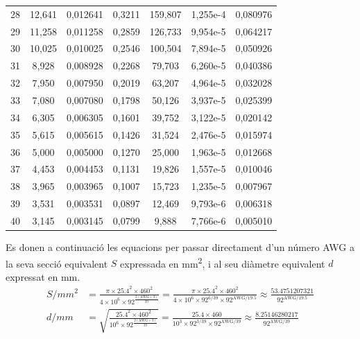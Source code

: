 \begin{longtable}{S[table-format=4.0]S[table-format=3.3]
                  S[table-format=2.6]S[table-format=2.4]
                  S[table-format=6.3]S[table-format=1.3e1]
                  S[table-format=3.6]}
28 &     12,641 &   0,012641 &     0,3211 &    159,807 &  1,255e-4 &   0,080976 \\
29 &     11,258 &   0,011258 &     0,2859 &    126,733 &  9,954e-5 &   0,064217 \\
30 &     10,025 &   0,010025 &     0,2546 &    100,504 &  7,894e-5 &   0,050926 \\
31 &      8,928 &   0,008928 &     0,2268 &     79,703 &  6,260e-5 &   0,040386 \\
32 &      7,950 &   0,007950 &     0,2019 &     63,207 &  4,964e-5 &   0,032028 \\
33 &      7,080 &   0,007080 &     0,1798 &     50,126 &  3,937e-5 &   0,025399 \\
34 &      6,305 &   0,006305 &     0,1601 &     39,752 &  3,122e-5 &   0,020142 \\
35 &      5,615 &   0,005615 &     0,1426 &     31,524 &  2,476e-5 &   0,015974 \\
36 &      5,000 &   0,005000 &     0,1270 &     25,000 &  1,963e-5 &   0,012668 \\
37 &      4,453 &   0,004453 &     0,1131 &     19,826 &  1,557e-5 &   0,010046 \\
38 &      3,965 &   0,003965 &     0,1007 &     15,723 &  1,235e-5 &   0,007967 \\
39 &      3,531 &   0,003531 &     0,0897 &     12,469 &  9,793e-6 &   0,006318 \\
40 &      3,145 &   0,003145 &     0,0799 &      9,888 &  7,766e-6 &   0,005010 \\
\bottomrule[1pt]
\end{longtable}

 Es donen a continuació les equacions per passar directament d'un número AWG a la seva secció equivalent $S$  expressada en \unit{mm^2}, i al seu diàmetre equivalent $d$  expressat en \unit{mm}.
\begin{align}
   S/{\scriptstyle\unit{mm^2}}  &= \frac{ \pi \times \num{25,4}^2 \times 460^2}{4 \times 10^6 \times 92^{\frac{2(\text{AWG}+3)}{39}}} =
   \frac{ \pi \times \num{25,4}^2 \times 460^2}{4 \times 10^6 \times 92^{6/39} \times 92^{\text{AWG}/\num{19,5}}} \approx
   \frac{\num{53,4751207321}}{92^{\text{AWG}/\num{19,5}}}\label{eq:awg_mm2}\\[2ex]
   d/{\scriptstyle\unit{mm}}  &= \sqrt{\frac{\num{25,4}^2 \times 460^2}{10^6 \times 92^{\frac{2(\text{AWG}+3)}{39}}}} =
   \frac{\num{25,4} \times 460}{10^3 \times 92^{3/39} \times 92^{\text{AWG}/39}} \approx
   \frac{\num{8,25146280217}}{92^{\text{AWG}/39}}\label{eq:awg_mm}
\end{align}

